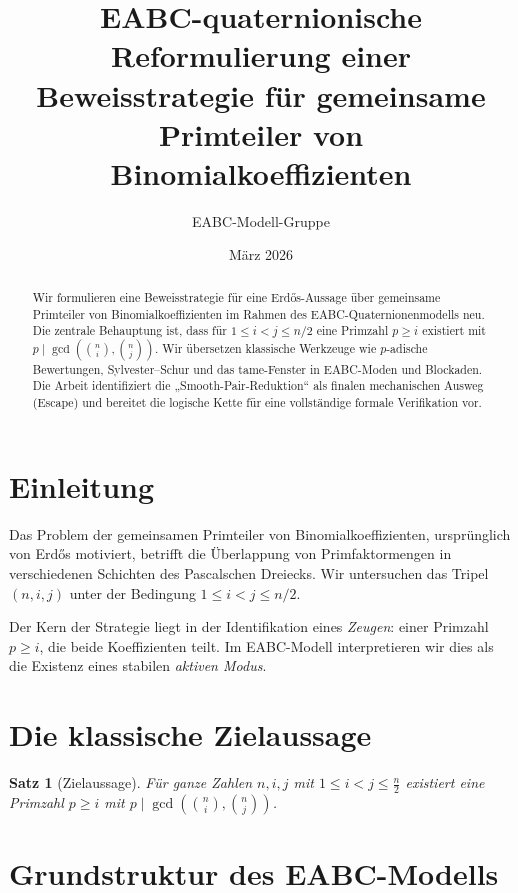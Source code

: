 \documentclass[12pt,a4paper]{article}
\title{EABC-quaternionische Reformulierung einer Beweisstrategie für gemeinsame Primteiler von Binomialkoeffizienten}
\author{EABC-Modell-Gruppe}
\date{März 2026}
\theoremstyle{plain}
\newtheorem{theorem}{Satz}[section]
\theoremstyle{definition}
\theoremstyle{remark}
\begin{document}
	
	\maketitle
	
	\begin{abstract}
		Wir formulieren eine Beweisstrategie für eine Erdős-Aussage über gemeinsame Primteiler von Binomialkoeffizienten im Rahmen des EABC-Quaternionenmodells neu. Die zentrale Behauptung ist, dass für $1\le i<j\le n/2$ eine Primzahl $p\ge i$ existiert mit $p \mid \gcd\left(\binom{n}{i},\binom{n}{j}\right)$. Wir übersetzen klassische Werkzeuge wie $p$-adische Bewertungen, Sylvester--Schur und das tame-Fenster in EABC-Moden und Blockaden. Die Arbeit identifiziert die „Smooth-Pair-Reduktion“ als finalen mechanischen Ausweg (Escape) und bereitet die logische Kette für eine vollständige formale Verifikation vor.
	\end{abstract}
	
	\tableofcontents
	
	\section{Einleitung}
	
	Das Problem der gemeinsamen Primteiler von Binomialkoeffizienten, ursprünglich von Erdős motiviert, betrifft die Überlappung von Primfaktormengen in verschiedenen Schichten des Pascalschen Dreiecks. Wir untersuchen das Tripel $(n,i,j)$ unter der Bedingung $1\le i<j\le n/2$.
	
	Der Kern der Strategie liegt in der Identifikation eines \emph{Zeugen}: einer Primzahl $p \ge i$, die beide Koeffizienten teilt. Im EABC-Modell interpretieren wir dies als die Existenz eines stabilen \emph{aktiven Modus}.
	
	\section{Die klassische Zielaussage}
	
	\begin{theorem}[Zielaussage]
		\label{thm:zielaussage}
		Für ganze Zahlen $n,i,j$ mit $1\le i<j\le \frac{n}{2}$ existiert eine Primzahl $p\ge i$ mit $p \mid \gcd\!\left(\binom{n}{i},\binom{n}{j}\right)$.
	\end{theorem}
	
	\section{Grundstruktur des EABC-Modells}
	
\end{document}
